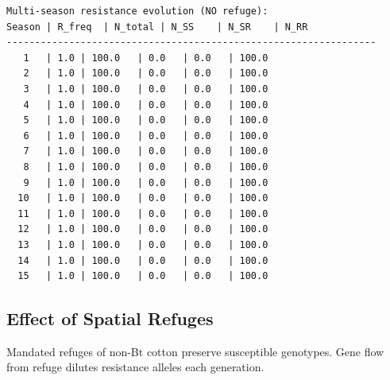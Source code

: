 



\begin{verbatim}
Multi-season resistance evolution (NO refuge):
Season | R_freq  | N_total | N_SS    | N_SR    | N_RR
-----------------------------------------------------------------
   1   | 1.0 | 100.0   | 0.0   | 0.0   | 100.0
   2   | 1.0 | 100.0   | 0.0   | 0.0   | 100.0
   3   | 1.0 | 100.0   | 0.0   | 0.0   | 100.0
   4   | 1.0 | 100.0   | 0.0   | 0.0   | 100.0
   5   | 1.0 | 100.0   | 0.0   | 0.0   | 100.0
   6   | 1.0 | 100.0   | 0.0   | 0.0   | 100.0
   7   | 1.0 | 100.0   | 0.0   | 0.0   | 100.0
   8   | 1.0 | 100.0   | 0.0   | 0.0   | 100.0
   9   | 1.0 | 100.0   | 0.0   | 0.0   | 100.0
  10   | 1.0 | 100.0   | 0.0   | 0.0   | 100.0
  11   | 1.0 | 100.0   | 0.0   | 0.0   | 100.0
  12   | 1.0 | 100.0   | 0.0   | 0.0   | 100.0
  13   | 1.0 | 100.0   | 0.0   | 0.0   | 100.0
  14   | 1.0 | 100.0   | 0.0   | 0.0   | 100.0
  15   | 1.0 | 100.0   | 0.0   | 0.0   | 100.0
\end{verbatim}



\subsection{Effect of Spatial Refuges}



\label{5398643545828420305}{}


Mandated refuges of non-Bt cotton preserve susceptible genotypes. Gene flow from refuge dilutes resistance alleles each generation.




